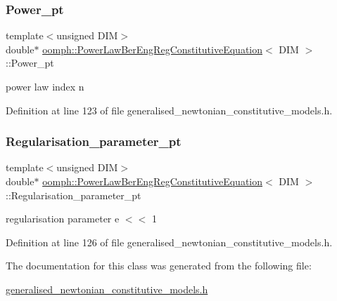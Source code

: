 \subsubsection{\texorpdfstring{Power\+\_\+pt}{Power\_pt}}
{\footnotesize\ttfamily template$<$unsigned D\+IM$>$ \\
double$\ast$ \hyperlink{classoomph_1_1PowerLawBerEngRegConstitutiveEquation}{oomph\+::\+Power\+Law\+Ber\+Eng\+Reg\+Constitutive\+Equation}$<$ D\+IM $>$\+::Power\+\_\+pt\hspace{0.3cm}{\ttfamily [private]}}



power law index n 



Definition at line 123 of file generalised\+\_\+newtonian\+\_\+constitutive\+\_\+models.\+h.

\mbox{\label{classoomph_1_1PowerLawBerEngRegConstitutiveEquation_af8832a1d0907a61e327f4335e28b95dd}} 
\subsubsection{\texorpdfstring{Regularisation\+\_\+parameter\+\_\+pt}{Regularisation\_parameter\_pt}}
{\footnotesize\ttfamily template$<$unsigned D\+IM$>$ \\
double$\ast$ \hyperlink{classoomph_1_1PowerLawBerEngRegConstitutiveEquation}{oomph\+::\+Power\+Law\+Ber\+Eng\+Reg\+Constitutive\+Equation}$<$ D\+IM $>$\+::Regularisation\+\_\+parameter\+\_\+pt\hspace{0.3cm}{\ttfamily [private]}}



regularisation parameter e $<$$<$ 1 



Definition at line 126 of file generalised\+\_\+newtonian\+\_\+constitutive\+\_\+models.\+h.



The documentation for this class was generated from the following file\+:\begin{DoxyCompactItemize}
\item 
\hyperlink{generalised__newtonian__constitutive__models_8h}{generalised\+\_\+newtonian\+\_\+constitutive\+\_\+models.\+h}\end{DoxyCompactItemize}
